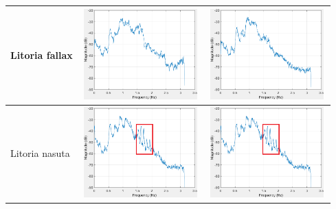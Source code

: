 \begin{table}[htb!]
{\begin{tabular}{lll}
Litoria fallax              & \begin{minipage}{.3\textwidth} \includegraphics[width=45mm, height=35mm]{image/4_signal.png}  \end{minipage}                             &                                               \begin{minipage}{.3\textwidth} \includegraphics[width=45mm, height=35mm]{image/4_noise.png}  \end{minipage} \\ \hline
Litoria nasuta              &   \begin{minipage}{.3\textwidth} \includegraphics[width=45mm, height=35mm]{image/5_signal.png}  \end{minipage}                           &                                               \begin{minipage}{.3\textwidth} \includegraphics[width=45mm, height=35mm]{image/5_signal.png}  \end{minipage} \\ \hline
\end{tabular}
}
\end{table}


